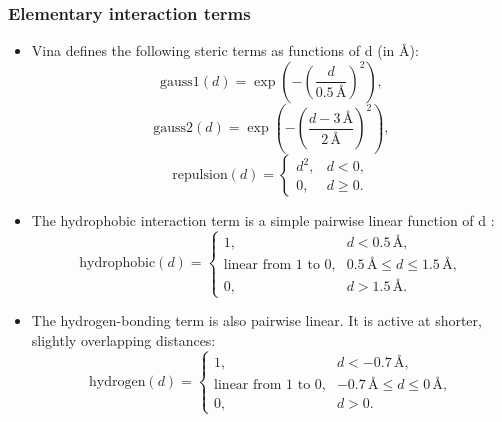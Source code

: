 \documentclass[12pt]{article}
\begin{document}
\subsubsection{Elementary interaction terms}
\begin{itemize}
\item Vina defines the following steric terms as functions of d (in \r{A}):
\begin{equation}
  \textrm{gauss1}(d) = \exp\!\left( - \left( \frac{d}{0.5 \,\textrm{\AA}} \right)^{2} \right),
\end{equation}
\begin{equation}
  \textrm{gauss2}(d) = \exp\!\left( - \left( \frac{d - 3 \,\textrm{\AA}}{2 \,\textrm{\AA}} \right)^{2} \right),
\end{equation}
\begin{equation}
  \textrm{repulsion}(d) =
  \begin{cases}
    d^{2}, & d < 0, \\
    0,     & d \ge 0.
  \end{cases}
\end{equation}

\item The hydrophobic interaction term is a simple pairwise linear function of d :
\begin{equation}
  \text{hydrophobic}(d) =
  \begin{cases}
    1, & d < 0.5 \,\text{\AA}, \\
    \text{linear from 1 to 0}, & 0.5 \,\text{\AA} \le d \le 1.5 \,\text{\AA}, \\
    0, & d > 1.5 \,\text{\AA}.
  \end{cases}
\end{equation}

\item The hydrogen-bonding term is also pairwise linear. It is active at shorter, slightly overlapping distances:
\begin{equation}
  \textrm{hydrogen}(d) =
  \begin{cases}
    1, & d < -0.7 \,\textrm{\AA}, \\
    \textrm{linear from 1 to 0}, & -0.7 \,\textrm{\AA} \le d \le 0 \,\textrm{\AA}, \\
    0, & d > 0.
  \end{cases}
\end{equation}


\end{itemize}
\end{document}
